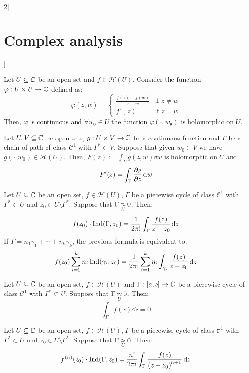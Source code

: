 \documentclass[../../../main.tex]{subfiles}
\begin{document}
\begin{multicols}{2}[\section{Complex analysis}]
  \begin{lemma}
    Let $U\subseteq\mathbb{C}$ be an open set and $f\in\mathcal{H}(U)$. Consider the function $\varphi:U\times U\rightarrow\mathbb{C}$ defined as:
    $$
      \varphi(z,w)=
      \begin{cases}
        \frac{f(z)-f(w)}{z-w} & \text{if }z\ne w \\
        f'(z)                 & \text{if }z=w
      \end{cases}
    $$
    Then, $\varphi$ is continuous and $\forall w_0\in U$ the function $\varphi(\cdot,w_0)$ is holomorphic on $U$.
  \end{lemma}
  \begin{lemma}
    Let $U,V\subseteq\mathbb{C}$ be open sets, $g:U\times V\rightarrow\mathbb{C}$ be a continuous function and $\Gamma$ be a chain of path of class $\mathcal{C}^1$ with $\Gamma^*\subset V$. Suppose that given $w_0\in V$ we have $g(\cdot,w_0)\in\mathcal{H}(U)$. Then, $F(z):=\int_\Gamma g(z,w)\dd{w}$ is holomorphic on $U$ and $$F'(z)=\int_\Gamma\pdv{g}{z}(z,w)\dd{w}$$
  \end{lemma}
  \begin{theorem}
    Let $U\subseteq\mathbb{C}$ be an open set, $f\in\mathcal{H}(U)$, $\Gamma$ be a piecewise cycle of class $\mathcal{C}^1$ with $\Gamma^*\subset U$ and $z_0\in U\setminus\Gamma^*$. Suppose that $\Gamma\mathbin{\underset{U}{\approx}} 0$. Then:
    $$f(z_0)\cdot\operatorname{Ind}(\Gamma,z_0)=\frac{1}{2\pi\mathrm{i}}\int_\Gamma\frac{f(z)}{z-z_0}\dd{z}$$
    If $\Gamma=n_1\gamma_1+\cdots+n_k\gamma_k$, the previous formula is equivalent to:
    $$f(z_0)\sum_{i=1}^kn_i\operatorname{Ind}(\gamma_i,z_0)=\frac{1}{2\pi\mathrm{i}}\sum_{i=1}^kn_i\int_{\gamma_i}\frac{f(z)}{z-z_0}\dd{z}$$
  \end{theorem}
  \begin{theorem}
    Let $U\subseteq \mathbb{C}$ be an open set, $f\in\mathcal{H}(U)$ and $\Gamma:[a,b]\rightarrow\mathbb{C}$ be a piecewise cycle of class $\mathcal{C}^1$ with $\Gamma^*\subset U$. Suppose that $\Gamma\mathbin{\underset{U}{\approx}} 0$. Then: $$\int_\Gamma f(z)\dd{z}=0$$
  \end{theorem}
  \begin{corollary}
    Let $U\subseteq\mathbb{C}$ be an open set, $f\in\mathcal{H}(U)$, $\Gamma$ be a piecewise cycle of class $\mathcal{C}^1$ with $\Gamma^*\subset U$ and $z_0\in U\setminus\Gamma^*$. Suppose that $\Gamma\mathbin{\underset{U}{\approx}} 0$. Then:
    $$f^{(n)}(z_0)\cdot\operatorname{Ind}(\Gamma,z_0)=\frac{n!}{2\pi\mathrm{i}}\int_\Gamma\frac{f(z)}{{(z-z_0)}^{n+1}}\dd{z}$$
  \end{corollary}

\end{multicols}
\end{document}
